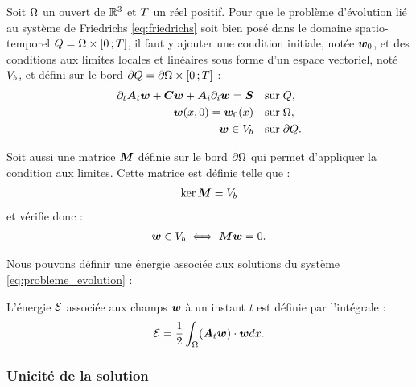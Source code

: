 Soit $\Omega$ un ouvert de $\mathbb{R}^{3}$ et $T$ un réel positif.
Pour que le problème d'évolution lié au système de Friedrichs \eqref{eq:friedrichs} soit bien posé
dans le domaine spatio-temporel $Q = \Omega \times \lbrack0\,;T\rbrack$,
il faut y ajouter une condition initiale, notée $\bm{w}_0$, et des conditions aux limites locales et linéaires
sous forme d'un espace vectoriel, noté $V_b$, et défini sur le bord
$\partial Q = \partial\Omega \times \lbrack0\,;T\rbrack$ :
\begin{subequations}
	\begin{align}
		\partial_{t} \bm{A}_{t} \bm{w} + \bm{C} \bm{w} + {\bm{A}_{i}\partial_{i}} \bm{w} = \bm{S}
		&\quad \mathrm{sur} \; Q ,
		\\
		\bm{w} (x, 0) = \bm{w}_0 (x)
		&\quad \mathrm{sur} \; \Omega ,
		\\
		\bm{w} \in V_b
		&\quad \mathrm{sur} \; \partial Q .
	\end{align}
	\label{eq:probleme_evolution}
\end{subequations}

Soit aussi une matrice $\bm{M}$ définie sur le bord $\partial\Omega$ qui permet
d’appliquer la condition aux limites. Cette matrice est définie telle que :
\begin{align}
\ker \bm{M} = V_b
\end{align}
et vérifie donc :
\begin{align}
	\bm{w} \in V_b \iff \bm{M} \bm{w} = 0 .
\end{align}

Nous pouvons définir une énergie associée aux solutions du système \eqref{eq:probleme_evolution} :
\begin{definition} \label{def:energie}
	L'énergie $\mathcal{E}$ associée aux champs $\bm{w}$ à un instant $t$ est définie par l'intégrale :
	\begin{align}
		\mathcal{E} = \frac{1}{2} \int_{\Omega} (\bm{A}_{t} \bm{w}) \cdot \bm{w} dx .
	\end{align}
\end{definition}


\subsubsection{Unicité de la solution}
\label{sssect:pb_evol_unicite}

